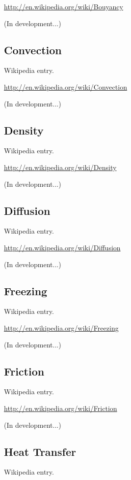 \documentclass[12pt,twoside]{book}
\begin{document}
\href{http://en.wikipedia.org/wiki/Bouyancy}{http://en.wikipedia.org/wiki/Bouyancy}

(In development...)

\subsection[Convection]{Convection}
Wikipedia entry.

\href{http://en.wikipedia.org/wiki/Convection}{http://en.wikipedia.org/wiki/Convection}

(In development...)

\subsection[Density]{Density}
Wikipedia entry.

\href{http://en.wikipedia.org/wiki/Density}{http://en.wikipedia.org/wiki/Density}

(In development...)

\subsection[Diffusion]{Diffusion}
Wikipedia entry.

\href{http://en.wikipedia.org/wiki/Diffusion}{http://en.wikipedia.org/wiki/Diffusion}

(In development...)

\subsection[Freezing]{Freezing}
Wikipedia entry.

\href{http://en.wikipedia.org/wiki/Freezing}{http://en.wikipedia.org/wiki/Freezing}

(In development...)

\subsection[Friction]{Friction}
Wikipedia entry.

\href{http://en.wikipedia.org/wiki/Friction}{http://en.wikipedia.org/wiki/Friction}

(In development...)

\subsection[Heat Transfer]{Heat Transfer}
Wikipedia entry.
\end{document}
